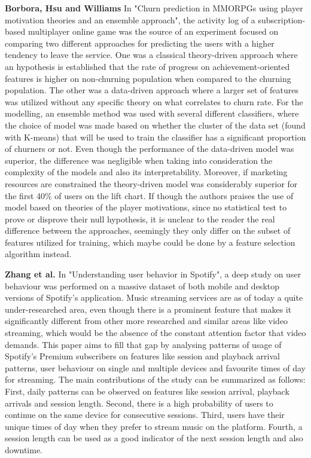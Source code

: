 \documentclass{kththesis}
\begin{document}
\textbf{Borbora, Hsu and Williams} \citep{Borbora2011} In "Churn prediction in MMORPGs using player motivation theories and an ensemble approach", the activity log of a subscription-based multiplayer online game was the source of an experiment focused on comparing two different approaches for predicting the users with a higher tendency to leave the service. One was a classical theory-driven approach where an hypothesis is established that the rate of progress on achievement-oriented features is higher on non-churning population when compared to the churning population. The other was a data-driven approach where a larger set of features was utilized without any specific theory on what correlates to churn rate. For the modelling, an ensemble method was used with several different classifiers, where the choice of model was made based on whether the cluster of the data set (found with K-means) that will be used to train the classifier has a significant proportion of churners or not. Even though the performance of the data-driven model was superior, the difference was negligible when taking into consideration the complexity of the models and also its interpretability. Moreover, if marketing resources are constrained the theory-driven model was considerably superior for the first 40\% of users on the lift chart. If though the authors praises the use of model based on theories of the player motivations, since no statistical test to prove or disprove their null hypothesis, it is unclear to the reader the real difference between the approaches, seemingly they only differ on the subset of features utilized for training, which maybe could be done by a feature selection algorithm instead. 

\textbf{Zhang et al.} \citep{Zhang2013} In "Understanding user behavior in Spotify", a deep study on user behaviour was performed on a massive dataset of both mobile and desktop versions of Spotify's application. Music streaming services are as of today a quite under-researched area, even though there is a prominent feature that makes it significantly different from other more researched and similar areas like video streaming, which would be the absence of the constant attention factor that video demands. This paper aims to fill that gap by analysing patterns of usage of Spotify's Premium subscribers on features like session and playback arrival patterns, user behaviour on single and multiple devices and favourite times of day for streaming. The main contributions of the study can be summarized as follows: First, daily patterns can be observed on features like session arrival, playback arrivals and session length. Second, there is a high probability of users to continue on the same device for consecutive sessions. Third, users have their unique times of day when they prefer to stream music on the platform. Fourth, a session length can be used as a good indicator of the next session length and also downtime.
\end{document}

